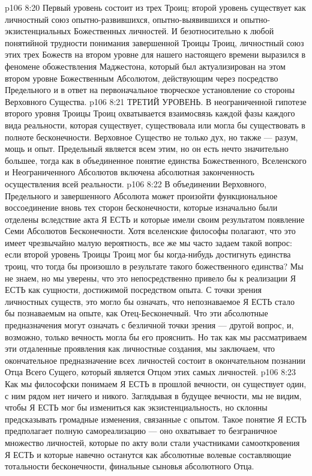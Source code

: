 \vs p106 8:20 Первый уровень состоит из трех Троиц; второй уровень существует как личностный союз опытно\hyp{}развившихся, опытно\hyp{}выявившихся и опытно\hyp{}экзистенциальных Божественных личностей. И безотносительно к любой понятийной трудности понимания завершенной Троицы Троиц, личностный союз этих трех Божеств на втором уровне для нашего настоящего времени выразился в феномене обожествления Маджестона, который был актуализирован на этом втором уровне Божественным Абсолютом, действующим через посредство Предельного и в ответ на первоначальное творческое установление со стороны Верховного Существа.
\vs p106 8:21 ТРЕТИЙ УРОВЕНЬ. В неограниченной гипотезе второго уровня Троицы Троиц охватывается взаимосвязь каждой фазы каждого вида реальности, которая существует, существовала или могла бы существовать в полноте бесконечности. Верховное Существо не только дух, но также --- разум, мощь и опыт. Предельный является всем этим, но он есть нечто значительно большее, тогда как в объединенное понятие единства Божественного, Вселенского и Неограниченного Абсолютов включена абсолютная законченность осуществления всей реальности.
\vs p106 8:22 В объединении Верховного, Предельного и завершенного Абсолюта может произойти функциональное воссоединение вновь тех сторон бесконечности, которые изначально были отделены вследствие акта Я ЕСТЬ и которые имели своим результатом появление Семи Абсолютов Бесконечности. Хотя вселенские философы полагают, что это имеет чрезвычайно малую вероятность, все же мы часто задаем такой вопрос: если второй уровень Троицы Троиц мог бы когда\hyp{}нибудь достигнуть единства троиц, что тогда бы произошло в результате такого божественного единства? Мы не знаем, но мы уверены, что это непосредственно привело бы к реализации Я ЕСТЬ как сущности, достижимой посредством опыта. С точки зрения личностных существ, это могло бы означать, что непознаваемое Я ЕСТЬ стало бы познаваемым на опыте, как Отец\hyp{}Бесконечный. Что эти абсолютные предназначения могут означать с безличной точки зрения --- другой вопрос, и, возможно, только вечность могла бы его прояснить. Но так как мы рассматриваем эти отдаленные проявления как личностные создания, мы заключаем, что окончательное предназначение всех личностей состоит в окончательном познании Отца Всего Сущего, который является Отцом этих самых личностей.
\vs p106 8:23 Как мы философски понимаем Я ЕСТЬ в прошлой вечности, он существует один, с ним рядом нет ничего и никого. Заглядывая в будущее вечности, мы не видим, чтобы Я ЕСТЬ мог бы измениться как экзистенциальность, но склонны предсказывать громадные изменения, связанные с опытом. Такое понятие Я ЕСТЬ предполагает полную самореализацию --- оно охватывает то безграничное множество личностей, которые по акту воли стали участниками самооткровения Я ЕСТЬ и которые навечно останутся как абсолютные волевые составляющие тотальности бесконечности, финальные сыновья абсолютного Отца.
